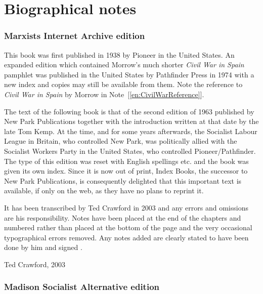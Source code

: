 \chapter{Biographical notes}

\subsection*{Marxists Internet Archive edition}

This book was first published in 1938 by Pioneer in the United States.
An expanded edition which contained Morrow’s much shorter \emph{Civil War in Spain} pamphlet was published in the United States by Path\-finder Press in 1974 with a new index and copies may still be available from them. Note the reference to \emph{Civil War in Spain} by Morrow in Note~[\ref{en:CivilWarReference}].

The text of the following book is that of the second edition of 1963 published by New Park Publications together with the introduction written at that date by the late Tom Kemp. At the time, and for some years afterwards, the Socialist Labour League in Britain, who controlled New Park, was politically allied with the Socialist Workers Party in the United States, who controlled Pioneer/Pathfinder. The type of this edition was reset with English spellings etc. and the book was given its own index. Since it is now out of print, Index Books, the successor to New Park Publications, is consequently delighted that this important text is available, if only on the web, as they have no plans to reprint it.

It has been transcribed by Ted Crawford in 2003 and any errors and omissions are his responsibility. Notes have been placed at the end of the chapters and numbered rather than placed at the bottom of the page and the very occasional typographical errors removed. Any notes added are clearly stated to have been done by him and signed \ERC.

\vspace{\fill}

\thispagestyle{empty}

\begin{flushright}
	\textsf{Ted Crawford}, 2003
\end{flushright}


\newpage

\thispagestyle{empty}

\subsection*{Madison Socialist Alternative edition}

